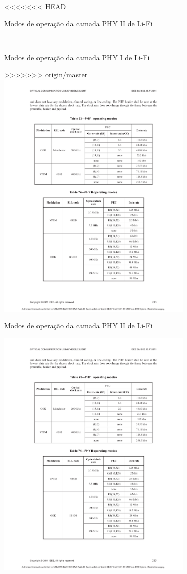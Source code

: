 <<<<<<< HEAD
	\begin{table}[h!]
		\caption{\label{tab_phy2} Modos de operação da camada PHY II de Li-Fi}
=======
	\begin{table}[htbp]
		\caption{\label{tab_phy1} Modos de operação da camada PHY I de Li-Fi}
>>>>>>> origin/master
		\centering
		\includegraphics[clip, trim=37mm 151mm 36mm 51mm,  width=0.7\textwidth]{pag213.pdf}
	\end{table}
	
	\begin{table}[htbp]
		\caption{\label{tab_phy2} Modos de operação da camada PHY II de Li-Fi}
		\centering
			\includegraphics[clip, trim=46.55mm 36.79mm 46.74mm 142.30mm,  width=0.7\textwidth]{pag213.pdf}
	\end{table}


\end{table}
